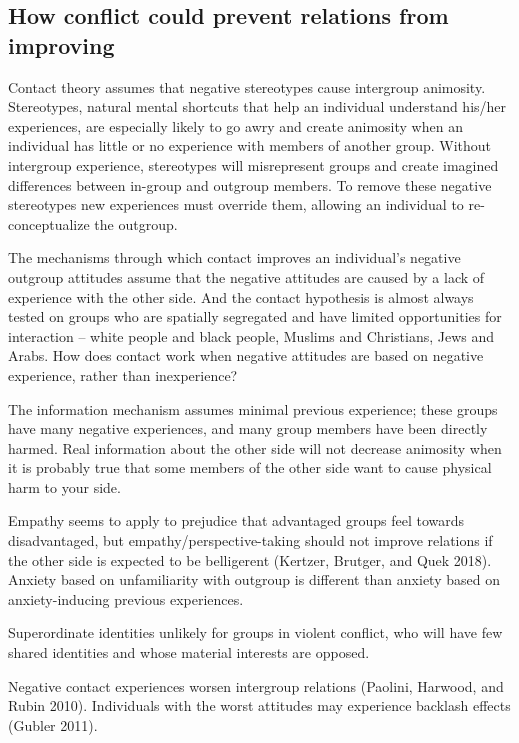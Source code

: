 \documentclass[11pt]{article}
\begin{document}
\hypertarget{how-conflict-could-prevent-relations-from-improving}{%
\subsection{How conflict could prevent relations from
improving}\label{how-conflict-could-prevent-relations-from-improving}}

Contact theory assumes that negative stereotypes cause intergroup
animosity. Stereotypes, natural mental shortcuts that help an individual
understand his/her experiences, are especially likely to go awry and
create animosity when an individual has little or no experience with
members of another group. Without intergroup experience, stereotypes
will misrepresent groups and create imagined differences between
in-group and outgroup members. To remove these negative stereotypes new
experiences must override them, allowing an individual to re-
conceptualize the outgroup.

The mechanisms through which contact improves an individual's negative
outgroup attitudes assume that the negative attitudes are caused by a
lack of experience with the other side. And the contact hypothesis is
almost always tested on groups who are spatially segregated and have
limited opportunities for interaction -- white people and black people,
Muslims and Christians, Jews and Arabs. How does contact work when
negative attitudes are based on negative experience, rather than
inexperience?

The information mechanism assumes minimal previous experience; these
groups have many negative experiences, and many group members have been
directly harmed. Real information about the other side will not decrease
animosity when it is probably true that some members of the other side
want to cause physical harm to your side.

Empathy seems to apply to prejudice that advantaged groups feel towards
disadvantaged, but empathy/perspective-taking should not improve
relations if the other side is expected to be belligerent (Kertzer,
Brutger, and Quek 2018). Anxiety based on unfamiliarity with outgroup is
different than anxiety based on anxiety-inducing previous experiences.

Superordinate identities unlikely for groups in violent conflict, who
will have few shared identities and whose material interests are
opposed.

Negative contact experiences worsen intergroup relations (Paolini,
Harwood, and Rubin 2010). Individuals with the worst attitudes may
experience backlash effects (Gubler 2011).
\end{document}
